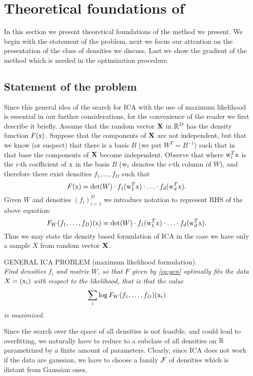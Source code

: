 \section{Theoretical foundations of \ICA{}}
\label{p}

In this section we present theoretical foundations of the method we present.
We begin with the statement of the problem, next we focus our attention on the presentation of the class of densities we discuss. Last we show the gradient of the method which is needed in the optimization procedure.


\subsection{Statement of the problem}

Since this general idea of the search for ICA with the use of
maximum likelihood is essential in our further considerations, for the convenience of the reader we first describe it briefly.
Assume that the random vector $\mathbf{X}$ in $\mathbb{R}^D$ has the density function $F(\mathrm{x})$.
Suppose that the components of $\mathbf{X}$ are not independent, but that
we know (or suspect) that there is a basis $B$ (we put $W^T=B^{-1}$) such that in that base the
components of $\mathbf{X}$ become independent. Observe that where $\mathrm{w}_i^T\mathrm{x}$ is the $i$-th coefficient of $\mathrm{x}$ in the basis $B$ ($\mathrm{w}_i$ denotes the $i$-th column of $W$), and therefore there exist densities 
$f_1,\ldots,f_D$ such that
\begin{equation} \label{eq:gen}
F(\mathrm{x})=\det(W) \cdot f_1(\mathrm{w}_1^T\mathrm{x}) \cdot \ldots \cdot f_d(\mathrm{w}_d^T\mathrm{x}).
\end{equation}
Given $W$ and densities $(f_i)_{i=1}^D$ we introduce notation to represent
RHS of the above equation:
$$
F_W(f_1,\ldots,f_D)(\mathrm{x})=\det(W) \cdot f_1(\mathrm{w}_1^T\mathrm{x}) \cdot \ldots \cdot f_d(\mathrm{w}_d^T\mathrm{x}).
$$
Thus we may state the density based formulation of ICA in the case we have only a sample
$X$ from random vector $\mathbf{X}$.

\medskip

\noindent GENERAL ICA PROBLEM (maximum likelihood formulation). \\{\em Find densities $f_i$ and matrix $W$, so that $F$ given by
\eqref{eq:gen} optimally fits the data $X=(\mathrm{x}_i)$ with respect to the likelihood, that is that the value
$$
\sum_i \log F_W(f_1,\ldots,f_D)(\mathrm{x}_i)
$$
is maximized.
}

\medskip

Since the search over the space of all densities is not feasible, and could lead to overfitting, we naturally have to reduce to a subclass of all densities on $\mathbb{R}$ parametrized by a finite amount of parameters. Clearly, since 
ICA does not work if the data are gaussian, we have to choose a family $\mathcal{F}$ of densities which is distant from Gaussian ones. 

